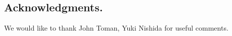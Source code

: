 \subsection*{Acknowledgments.}
We would like to thank John Toman, Yuki Nishida for useful comments.
